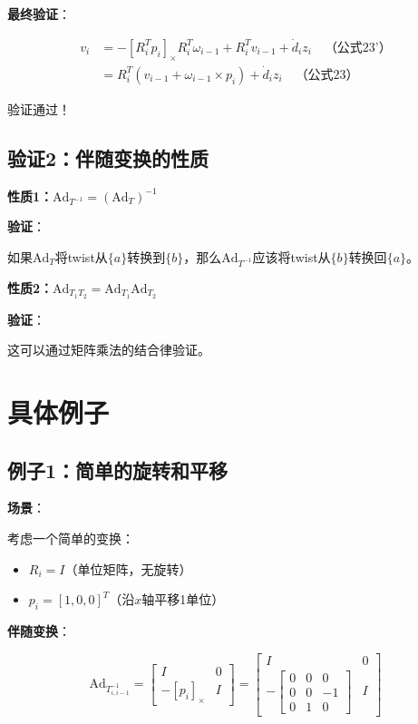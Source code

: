 \documentclass[12pt,a4paper]{article}
\begin{document}
\textbf{最终验证}：

\begin{align}
v_i &= -[R_i^T p_i]_{\times} R_i^T \omega_{i-1} + R_i^T v_{i-1} + \dot{d}_i z_i \quad \text{（公式23'）} \\
&= R_i^T (v_{i-1} + \omega_{i-1} \times p_i) + \dot{d}_i z_i \quad \text{（公式23）}
\end{align}

验证通过！

\subsection{验证2：伴随变换的性质}

\textbf{性质1：$\text{Ad}_{T^{-1}} = (\text{Ad}_T)^{-1}$}

\textbf{验证}：

如果$\text{Ad}_T$将twist从$\{a\}$转换到$\{b\}$，那么$\text{Ad}_{T^{-1}}$应该将twist从$\{b\}$转换回$\{a\}$。

\textbf{性质2：$\text{Ad}_{T_1 T_2} = \text{Ad}_{T_1} \text{Ad}_{T_2}$}

\textbf{验证}：

这可以通过矩阵乘法的结合律验证。

\section{具体例子}

\subsection{例子1：简单的旋转和平移}

\textbf{场景}：

考虑一个简单的变换：
\begin{itemize}
\item $R_i = I$（单位矩阵，无旋转）
\item $p_i = [1, 0, 0]^T$（沿$x$轴平移1单位）
\end{itemize}

\textbf{伴随变换}：

\begin{equation}
\text{Ad}_{T_{i,i-1}^{-1}} = \begin{bmatrix}
I & 0 \\
-[p_i]_{\times} & I
\end{bmatrix} = \begin{bmatrix}
I & 0 \\
-\begin{bmatrix} 0 & 0 & 0 \\ 0 & 0 & -1 \\ 0 & 1 & 0 \end{bmatrix} & I
\end{bmatrix}
\end{equation}
\end{document}
